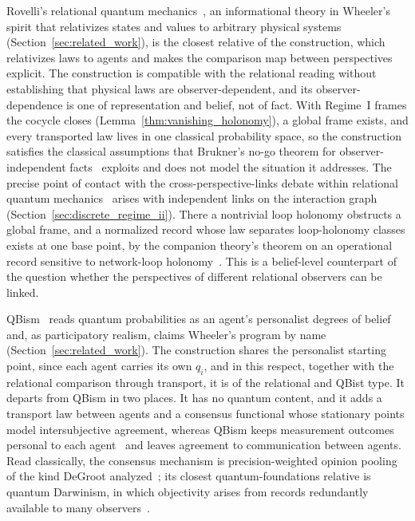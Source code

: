\documentclass[11pt]{article}
\begin{document}
Rovelli's relational quantum mechanics~\cite{Rovelli1996}, an informational theory in Wheeler's spirit that relativizes states and values to arbitrary physical systems (Section~\ref{sec:related_work}), is the closest relative of the construction, which relativizes laws to agents and makes the comparison map between perspectives explicit. The construction is compatible with the relational reading without establishing that physical laws are observer-dependent, and its observer-dependence is one of representation and belief, not of fact. With Regime~I frames the cocycle closes (Lemma~\ref{thm:vanishing_holonomy}), a global frame exists, and every transported law lives in one classical probability space, so the construction satisfies the classical assumptions that Brukner's no-go theorem for observer-independent facts~\cite{Brukner2018} exploits and does not model the situation it addresses. The precise point of contact with the cross-perspective-links debate within relational quantum mechanics~\cite{AdlamRovelli2022} arises with independent links on the interaction graph (Section~\ref{sec:discrete_regime_ii}). There a nontrivial loop holonomy obstructs a global frame, and a normalized record whose law separates loop-holonomy classes exists at one base point, by the companion theory's theorem on an operational record sensitive to network-loop holonomy~\cite[Ch.~10]{DennisGaugeVFE2026}. This is a belief-level counterpart of the question whether the perspectives of different relational observers can be linked.

QBism~\cite{Fuchs2014, Fuchs2017} reads quantum probabilities as an agent's personalist degrees of belief and, as participatory realism, claims Wheeler's program by name (Section~\ref{sec:related_work}). The construction shares the personalist starting point, since each agent carries its own $q_i$, and in this respect, together with the relational comparison through transport, it is of the relational and QBist type. It departs from QBism in two places. It has no quantum content, and it adds a transport law between agents and a consensus functional whose stationary points model intersubjective agreement, whereas QBism keeps measurement outcomes personal to each agent~\cite{DeBrotaFuchsSchack2020} and leaves agreement to communication between agents. Read classically, the consensus mechanism is precision-weighted opinion pooling of the kind DeGroot analyzed~\cite{degroot1974}; its closest quantum-foundations relative is quantum Darwinism, in which objectivity arises from records redundantly available to many observers~\cite{Zurek2009}.
\end{document}
